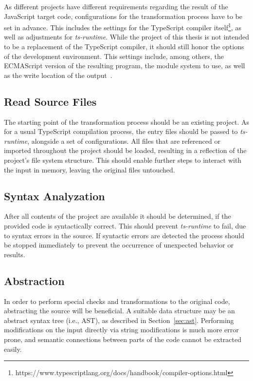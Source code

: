 As different projects have different requirements regarding the result of the JavaScript target code, configurations for the transformation process have to be set in advance. This includes the settings for the TypeScript compiler itself\footnote{https://www.typescriptlang.org/docs/handbook/compiler-options.html}, as well as adjustments for \emph{ts-runtime}. While the project of this thesis is not intended to be a replacement of the TypeScript compiler, it should still honor the options of the development environment. This settings include, among others, the ECMAScript version of the resulting program, the module system to use, as well as the write location of the output~\cite{TypeScriptHandbook:CompilerOptions}.

\subsection{Read Source Files}

The starting point of the transformation process should be an existing project. As for a usual TypeScript compilation process, the entry files should be passed to \emph{ts-runtime}, alongside a set of configurations. All files that are referenced or imported throughout the project should be loaded, resulting in a reflection of the project's file system structure. This should enable further steps to interact with the input in memory, leaving the original files untouched.

\subsection{Syntax Analyzation}

After all contents of the project are available it should be determined, if the provided code is syntactically correct. This should prevent \emph{ts-runtime} to fail, due to syntax errors in the source. If syntactic errors are detected the process should be stopped immediately to prevent the occurrence of unexpected behavior or results.

\subsection{Abstraction}

In order to perform special checks and transformations to the original code, abstracting the source will be beneficial. A suitable data structure may be an abstract syntax tree (i.e., AST), as described in Section~\ref{sec:ast}. Performing modifications on the input directly via string modifications is much more error prone, and semantic connections between parts of the code cannot be extracted easily.

